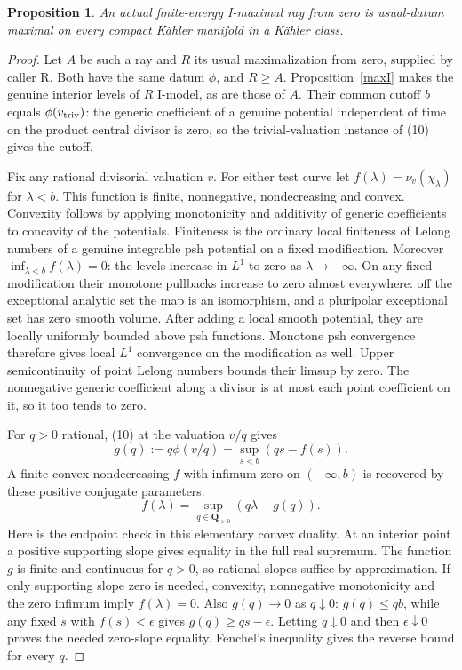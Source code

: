 \documentclass[11pt]{article}
\newtheorem{proposition}[theorem]{Proposition}
\begin{document}
\begin{proposition}\label{Imaxusual}
An actual finite-energy I-maximal ray from zero is usual-datum maximal
on every compact K\"ahler manifold in a K\"ahler class.
\end{proposition}
\begin{proof}
Let $A$ be such a ray and $R$ its usual maximalization from zero, supplied
by caller R. Both have the same datum $\phi$, and $R\ge A$.
Proposition~\ref{maxI} makes the genuine interior levels of $R$ I-model,
as are those of $A$. Their common cutoff $b$ equals
$\phi(v_{\rm triv})$: the generic coefficient of a genuine potential
independent of time on the product central divisor is zero, so the
trivial-valuation instance of (10) gives the cutoff.

Fix any rational divisorial valuation $v$. For either test curve let
$f(\lambda)=\nu_v(\chi_\lambda)$ for $\lambda<b$. This function is
finite, nonnegative, nondecreasing and convex. Convexity follows by
applying monotonicity and additivity of generic coefficients to
concavity of the potentials. Finiteness is the ordinary local
finiteness of Lelong numbers of a genuine integrable psh potential
on a fixed modification. Moreover $\inf_{\lambda<b}f(\lambda)=0$:
the levels increase in $L^1$ to zero as $\lambda\to-\infty$.
On any fixed modification their monotone pullbacks increase to zero
almost everywhere: off the exceptional analytic set the map is an
isomorphism, and a pluripolar exceptional set has zero smooth volume.
After adding a local smooth potential, they are locally uniformly
bounded above psh functions. Monotone psh convergence therefore gives
local $L^1$ convergence on the modification as well. Upper
semicontinuity of point Lelong numbers bounds their limsup by zero.
The nonnegative generic coefficient along a divisor is at most each
point coefficient on it, so it too tends to zero.

For $q>0$ rational, (10) at the valuation $v/q$ gives
\[
 g(q):=q\phi(v/q)=\sup_{s<b}(qs-f(s)).                     \tag{23}
\]
A finite convex nondecreasing $f$ with infimum zero on $(-\infty,b)$
is recovered by these positive conjugate parameters:
\[
 f(\lambda)=\sup_{q\in\mathbf Q_{>0}}(q\lambda-g(q)).       \tag{24}
\]
Here is the endpoint check in this elementary convex duality. At an
interior point a positive supporting slope gives equality in the full
real supremum. The function $g$ is finite and continuous for $q>0$,
so rational slopes suffice by approximation. If only supporting slope
zero is needed, convexity, nonnegative monotonicity and the zero
infimum imply $f(\lambda)=0$. Also $g(q)\to0$ as $q\downarrow0$:
$g(q)\le qb$, while any fixed $s$ with $f(s)<\epsilon$ gives
$g(q)\ge qs-\epsilon$. Letting $q\downarrow0$ and then
$\epsilon\downarrow0$ proves the needed zero-slope equality.
Fenchel's inequality gives the reverse bound for every $q$.


\end{proof}
\end{document}
